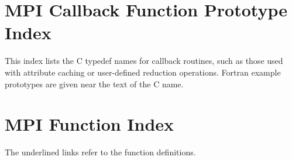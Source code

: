

\newpage
\chapter*{MPI Callback Function Prototype Index}
\label{index:callback}
This index lists the C typedef names for callback routines, such as those used with attribute caching or user-defined reduction operations.  Fortran example prototypes are given near the text of the C name.



\newpage
\chapter*{MPI Function Index}
\label{index:function}
The underlined links refer to the function definitions.



